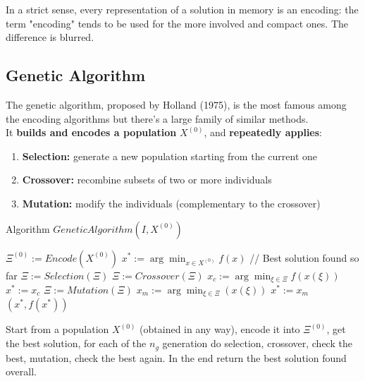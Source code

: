 In a strict sense, every representation of a solution in memory is an encoding: the term "encoding" tends to be used for the more involved and compact ones. The difference is blurred.\\

\newpage

\subsection{Genetic Algorithm}

The genetic algorithm, proposed by Holland (1975), is the most famous among the encoding algorithms but there's a large family of similar methods.\\

It \textbf{builds and encodes a population} $X^{(0)}$, and \textbf{repeatedly applies}:
\begin{enumerate}
	\item \textbf{Selection:} generate a new population starting from the current one
	\item \textbf{Crossover:} recombine subsets of two or more individuals
	\item \textbf{Mutation:} modify the individuals (complementary to the crossover)
\end{enumerate}

\nn

\begin{algorithm}[H]
	\caption{Algorithm $GeneticAlgorithm(I , X^{(0)})$}
	\begin{algorithmic}
		\STATE $\Xi^{(0)} := Encode(X^{(0)})$
		\STATE $x^\ast := \arg \min_{x \in X^{(0)}} f(x)$ // Best solution found so far
		\STATE $\Xi := Selection(\Xi)$
		\STATE $\Xi := Crossover(\Xi)$
		\STATE $x_c := \arg \min_{\xi \in \Xi} f (x (\xi))$
		\STATE $x^\ast := x_c$
		\ENDIF
		\STATE $\Xi := Mutation(\Xi)$
		\STATE $x_m := \arg \min_{\xi \in \Xi} (x (\xi))$
		\STATE $x^\ast := x_m$
		\ENDIF
		\ENDFOR
		\RETURN $(x^\ast, f (x^\ast))$
	\end{algorithmic}
\end{algorithm}

Start from a population $X^{(0)}$ (obtained in any way), encode it into $\Xi^{(0)}$, get the best solution, for each of the $n_g$ generation do selection, crossover, check the best, mutation, check the best again. In the end return the best solution found overall.\\

